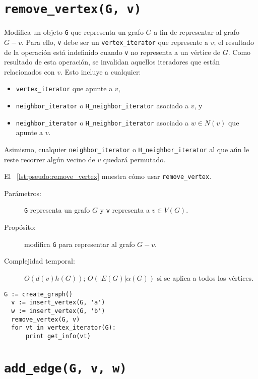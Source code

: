 \documentclass[%
    a4paper,%
    fontsize=12pt,%
    DIV=12,
    twoside,%
    openright,%
    titlepage=true,%
    headsepline,%
    toc=bibliography,%
    parskip=half,%
    cleardoublepage=empty,%
    headings=big,%
]{scrbook}
\makeatletter
\newcommand{\Code}[2][]{\lstinline[basicstyle={\ttfamily},#1]@#2@}
\makeatother
\begin{document}
\section{\texorpdfstring{\Code{remove_vertex(G, v)}}{remove\_vertex(G, v)}}
\label{sec:tad grafo:remove-vertex}

Modifica un objeto \Code{G} que representa un grafo $G$ a fin de representar al grafo $G - v$.  Para ello, \Code{v} debe ser un \Code{vertex_iterator} que represente a $v$; el resultado de la operación está indefinido cuando \Code{v} no representa a un vértice de $G$.  Como resultado de esta operación, se invalidan aquellos iteradores que están relacionados con $v$.  Esto incluye a cualquier:
\begin{itemize}
  \item \Code{vertex_iterator} que apunte a $v$, 
  \item \Code{neighbor_iterator} o \Code{H_neighbor_iterator} asociado a $v$, y 
  \item \Code{neighbor_iterator} o \Code{H_neighbor_iterator} asociado a $w \in N(v)$ que apunte a $v$.
\end{itemize}
Asimismo, cualquier \Code{neighbor_iterator} o \Code{H_neighbor_iterator} al que aún le reste recorrer algún vecino de $v$ quedará permutado.
  
El \lstlistingname~\ref{lst:pseudo:remove_vertex} muestra cómo usar \Code{remove_vertex}.
  
\begin{description}
  \item [Parámetros:] \Code{G} representa un grafo $G$ y \Code{v} representa a $v \in V(G)$.
  \item [Propósito:] modifica \Code{G} para representar al grafo $G - v$.
  \item [Complejidad temporal:] $O(d(v)h(G))$; $O(|E(G)|\alpha(G))$ si se aplica a todos los vértices.
\end{description}


\begin{lstlisting}[caption={Ejemplo de uso de \Code{remove_vertex} para imprimir `b'. Ver Sección~\ref{sec:tad grafo:vertex-iterator} para más información de \Code{vertex_iterator}.},gobble=2,float=ht,label={lst:pseudo:remove_vertex},emph={remove_vertex}]
  G := create_graph()
  v := insert_vertex(G, 'a')
  w := insert_vertex(G, 'b')
  remove_vertex(G, v)
  for vt in vertex_iterator(G):
      print get_info(vt)
\end{lstlisting}


\section{\texorpdfstring{\Code{add_edge(G, v, w)}}{add\_edge(G, v, w)}}
\label{sec:tad grafo:add-edge}
\end{document}
